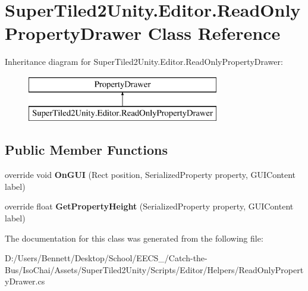 \hypertarget{class_super_tiled2_unity_1_1_editor_1_1_read_only_property_drawer}{}\section{Super\+Tiled2\+Unity.\+Editor.\+Read\+Only\+Property\+Drawer Class Reference}
\label{class_super_tiled2_unity_1_1_editor_1_1_read_only_property_drawer}
Inheritance diagram for Super\+Tiled2\+Unity.\+Editor.\+Read\+Only\+Property\+Drawer\+:\begin{figure}[H]
\begin{center}
\leavevmode
\includegraphics[height=2.000000cm]{class_super_tiled2_unity_1_1_editor_1_1_read_only_property_drawer}
\end{center}
\end{figure}
\subsection*{Public Member Functions}
\begin{DoxyCompactItemize}
\item 
\mbox{\label{class_super_tiled2_unity_1_1_editor_1_1_read_only_property_drawer_a7b7ccc21124ba7bf9b94e55cf0fca200}} 
override void {\bfseries On\+G\+UI} (Rect position, Serialized\+Property property, G\+U\+I\+Content label)
\item 
\mbox{\label{class_super_tiled2_unity_1_1_editor_1_1_read_only_property_drawer_ac009c95c29c9bf419caa057f0de7fe32}} 
override float {\bfseries Get\+Property\+Height} (Serialized\+Property property, G\+U\+I\+Content label)
\end{DoxyCompactItemize}


The documentation for this class was generated from the following file\+:\begin{DoxyCompactItemize}
\item 
D\+:/\+Users/\+Bennett/\+Desktop/\+School/\+E\+E\+C\+S\+\_/\+Catch-\/the-\/\+Bus/\+Iso\+Chai/\+Assets/\+Super\+Tiled2\+Unity/\+Scripts/\+Editor/\+Helpers/Read\+Only\+Property\+Drawer.\+cs\end{DoxyCompactItemize}

